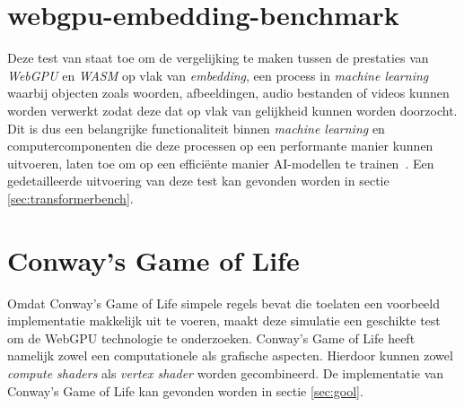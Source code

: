 \break{}

\section{webgpu-embedding-benchmark}

Deze test van \textcite{Lochner2024} staat toe om de vergelijking te maken tussen de prestaties van \textit{WebGPU} en \textit{WASM} op vlak van \textit{embedding}, een process in \textit{machine learning} waarbij objecten zoals woorden, afbeeldingen, audio bestanden of videos kunnen worden verwerkt zodat deze dat op vlak van gelijkheid kunnen worden doorzocht. Dit is dus een belangrijke functionaliteit binnen \textit{machine learning} en computercomponenten die deze processen op een performante manier kunnen uitvoeren, laten toe om op een efficiënte manier AI-modellen te trainen~\autocite{Cloudflare2024}. Een gedetailleerde uitvoering van deze test kan gevonden worden in sectie \ref{sec:transformerbench}.

\section{Conway's Game of Life}

Omdat Conway's Game of Life simpele regels bevat die toelaten een voorbeeld implementatie makkelijk uit te voeren, maakt deze simulatie een geschikte test om de WebGPU technologie te onderzoeken. Conway's Game of Life heeft namelijk zowel een computationele als grafische aspecten. Hierdoor kunnen zowel \textit{compute shaders} als \textit{vertex shader} worden gecombineerd. De implementatie van Conway's Game of Life kan gevonden worden in sectie \ref{sec:gool}.